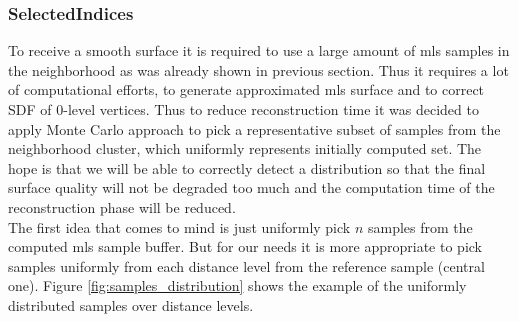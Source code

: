 \subsubsection{SelectedIndices}
To receive a smooth surface it is required to use a large amount of mls samples in the neighborhood as was already shown in previous section. Thus it requires a lot of computational efforts, to generate approximated mls surface and to correct SDF of 0-level vertices. Thus to reduce reconstruction time it was decided to apply Monte Carlo approach to pick a representative subset of samples from the neighborhood cluster, which uniformly represents initially computed set. The hope is that we will be able to correctly detect a distribution so that the final surface quality will not be degraded too much and the computation time of the reconstruction phase will be reduced.\\
The first idea that comes to mind is just uniformly pick $n$ samples from the computed mls sample buffer. But for our needs it is more appropriate to pick samples uniformly from each distance level from the reference sample (central one). Figure \ref{fig:samples_distribution} shows the example of the uniformly distributed samples over distance levels.
